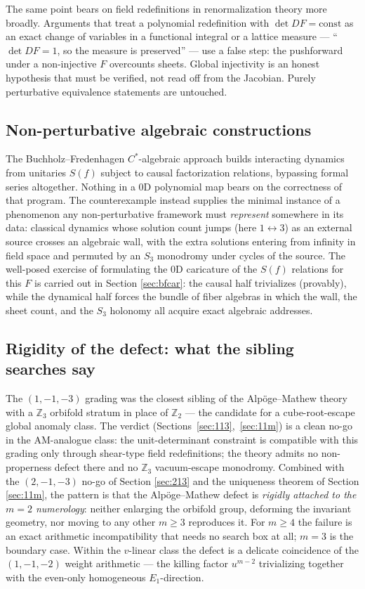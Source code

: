 \documentclass[11pt]{article}
\theoremstyle{definition}
\theoremstyle{remark}
\newcommand{\Z}{\mathbb{Z}}
\begin{document}
The same point bears on field redefinitions in renormalization theory
more broadly. Arguments that treat a polynomial redefinition with
$\det DF=\mathrm{const}$ as an exact change of variables in a
functional integral or a lattice measure --- ``$\det DF=1$, so the
measure is preserved'' --- use a false step: the pushforward under a
non-injective $F$ overcounts sheets. Global injectivity is an honest
hypothesis that must be verified, not read off from the Jacobian.
Purely perturbative equivalence statements are untouched.

\subsection{Non-perturbative algebraic constructions}
\label{sec:bf}

The Buchholz--Fredenhagen $C^*$-algebraic approach \cite{BF20} builds
interacting dynamics from unitaries $S(f)$ subject to causal
factorization relations, bypassing formal series altogether. Nothing
in a 0D polynomial map bears on the correctness of that program. The
counterexample instead supplies the minimal instance of a phenomenon
any non-perturbative framework must \emph{represent} somewhere in its
data: classical dynamics whose solution count jumps (here
$1\leftrightarrow 3$) as an external source crosses an algebraic wall,
with the extra solutions entering from infinity in field space and
permuted by an $S_3$ monodromy under cycles of the source. The
well-posed exercise of formulating the 0D caricature of the $S(f)$
relations for this $F$ is carried out in Section \ref{sec:bfcar}: the
causal half trivializes (provably), while the dynamical half forces
the bundle of fiber algebras in which the wall, the sheet count, and
the $S_3$ holonomy all acquire exact algebraic addresses.

\subsection{Rigidity of the defect: what the sibling searches say}

The $(1,-1,-3)$ grading was the closest sibling of the Alp\"oge--Mathew
theory with a $\Z_3$ orbifold stratum in place of $\Z_2$ --- the
candidate for a cube-root-escape global anomaly class. The verdict
(Sections~\ref{sec:113},~\ref{sec:11m}) is a clean no-go in the
AM-analogue class: the unit-determinant constraint is compatible with
this grading only through shear-type field redefinitions; the theory
admits no non-properness defect there and no $\Z_3$ vacuum-escape
monodromy. Combined with the $(2,-1,-3)$ no-go of Section
\ref{sec:213} and the uniqueness theorem of Section \ref{sec:11m}, the
pattern is that the Alp\"oge--Mathew defect is \emph{rigidly attached
to the $m=2$ numerology}: neither enlarging the orbifold group,
deforming the invariant geometry, nor moving to any other $m\ge 3$
reproduces it. For $m\ge 4$ the failure is an exact arithmetic
incompatibility that needs no search box at all; $m=3$ is the boundary
case. Within the $v$-linear class the defect is a delicate coincidence
of the $(1,-1,-2)$ weight arithmetic --- the killing factor $u^{m-2}$
trivializing together with the even-only homogeneous $E_1$-direction.
\end{document}
